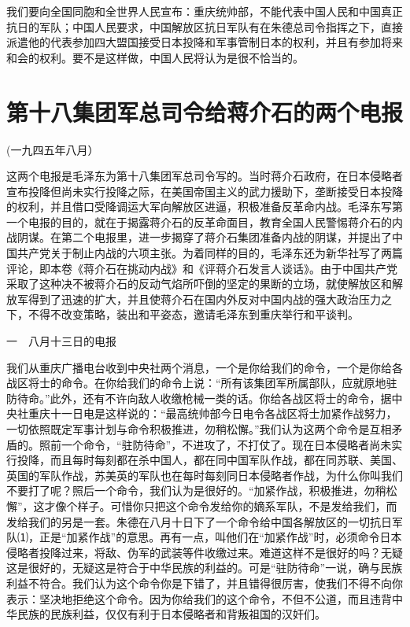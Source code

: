 \documentclass[UTF-8, a5paper, 12pt]{ctexart}
\begin{document}
我们要向全国同胞和全世界人民宣布：重庆统帅部，不能代表中国人民和中国真正抗日的军队；中国人民要求，中国解放区抗日军队有在朱德总司令指挥之下，直接派遣他的代表参加四大盟国接受日本投降和军事管制日本的权利，并且有参加将来和会的权利。要不是这样做，中国人民将认为是很不恰当的。
\section{第十八集团军总司令给蒋介石的两个电报}

(一九四五年八月）

这两个电报是毛泽东为第十八集团军总司令写的。当时蒋介石政府，在日本侵略者宣布投降但尚未实行投降之际，在美国帝国主义的武力援助下，垄断接受日本投降的权利，并且借口受降调运大军向解放区进逼，积极准备反革命内战。毛泽东写第一个电报的目的，就在于揭露蒋介石的反革命面目，教育全国人民警惕蒋介石的内战阴谋。在第二个电报里，进一步揭穿了蒋介石集团准备内战的阴谋，并提出了中国共产党关于制止内战的六项主张。为着同样的目的，毛泽东还为新华社写了两篇评论，即本卷《蒋介石在挑动内战》和《评蒋介石发言人谈话》。由于中国共产党采取了这种决不被蒋介石的反动气焰所吓倒的坚定的果断的立场，就使解放区和解放军得到了迅速的扩大，并且使蒋介石在国内外反对中国内战的强大政治压力之下，不得不改变策略，装出和平姿态，邀请毛泽东到重庆举行和平谈判。

一　八月十三日的电报

我们从重庆广播电台收到中央社两个消息，一个是你给我们的命令，一个是你给各战区将士的命令。在你给我们的命令上说：“所有该集团军所属部队，应就原地驻防待命。”此外，还有不许向敌人收缴枪械一类的话。你给各战区将士的命令，据中央社重庆十一日电是这样说的：“最高统帅部今日电令各战区将士加紧作战努力，一切依照既定军事计划与命令积极推进，勿稍松懈。”我们认为这两个命令是互相矛盾的。照前一个命令，“驻防待命”，不进攻了，不打仗了。现在日本侵略者尚未实行投降，而且每时每刻都在杀中国人，都在同中国军队作战，都在同苏联、美国、英国的军队作战，苏美英的军队也在每时每刻同日本侵略者作战，为什么你叫我们不要打了呢？照后一个命令，我们认为是很好的。“加紧作战，积极推进，勿稍松懈”，这才像个样子。可惜你只把这个命令发给你的嫡系军队，不是发给我们，而发给我们的另是一套。朱德在八月十日下了一个命令给中国各解放区的一切抗日军队⑴，正是“加紧作战”的意思。再有一点，叫他们在“加紧作战”时，必须命令日本侵略者投降过来，将敌、伪军的武装等件收缴过来。难道这样不是很好的吗？无疑这是很好的，无疑这是符合于中华民族的利益的。可是“驻防待命”一说，确与民族利益不符合。我们认为这个命令你是下错了，并且错得很厉害，使我们不得不向你表示：坚决地拒绝这个命令。因为你给我们的这个命令，不但不公道，而且违背中华民族的民族利益，仅仅有利于日本侵略者和背叛祖国的汉奸们。
\end{document}

